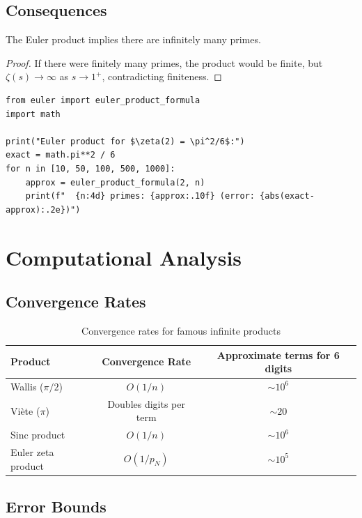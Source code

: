 \subsection{Consequences}

\begin{theorem}
The Euler product implies there are infinitely many primes.
\end{theorem}

\begin{proof}
If there were finitely many primes, the product would be finite, but $\zeta(s) \to \infty$
as $s \to 1^+$, contradicting finiteness.
\end{proof}

\begin{lstlisting}[caption={Euler product for $\zeta(2)$}, label=lst:euler_zeta_product]
from euler import euler_product_formula
import math

print("Euler product for $\zeta(2) = \pi^2/6$:")
exact = math.pi**2 / 6
for n in [10, 50, 100, 500, 1000]:
    approx = euler_product_formula(2, n)
    print(f"  {n:4d} primes: {approx:.10f} (error: {abs(exact-approx):.2e})")
\end{lstlisting}

\section{Computational Analysis}

\subsection{Convergence Rates}

\begin{table}[H]
\centering
\begin{tabular}{l|c|c}
Product & Convergence Rate & Approximate terms for 6 digits \\
\hline
Wallis ($\pi/2$) & $O(1/n)$ & $\sim 10^6$ \\
Vi\`{e}te ($\pi$) & Doubles digits per term & $\sim 20$ \\
Sinc product & $O(1/n)$ & $\sim 10^6$ \\
Euler zeta product & $O(1/p_N)$ & $\sim 10^5$ \\
\hline
\end{tabular}
\caption{Convergence rates for famous infinite products}
\end{table}

\subsection{Error Bounds}

